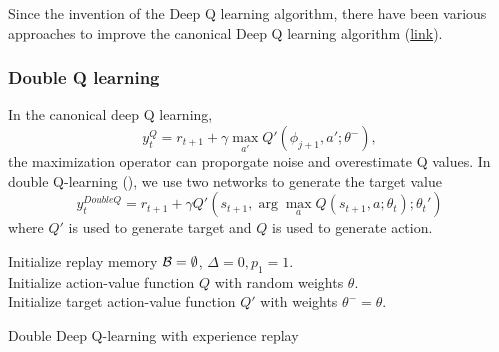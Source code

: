 \begin{refsection}
Since the invention of the Deep Q learning algorithm, there have been various approaches to improve the canonical Deep Q learning algorithm (\href{https://zhuanlan.zhihu.com/p/21547911}{link}).


\subsubsection{Double Q learning}

In the canonical deep Q learning, 
$$y_t^{Q} = r_{t+1} + \gamma \max_{a'}Q'(\phi_{j+1},a';\theta^-),$$
the maximization operator can proporgate noise and overestimate Q values. 
In double Q-learning (\cite{van2016deep}), we use two networks to generate the target value
$$y_t^{DoubleQ} = r_{t+1} + \gamma Q'(s_{t+1}, \arg\max_{a}Q(s_{t+1},a;\theta_t);\theta_t')$$
where $Q'$ is used to generate target and $Q$ is used to generate action. 


\begin{algorithm}
	Initialize replay memory $\mathcal{B} = \emptyset$, $\Delta = 0, p_1 = 1$.\\
	Initialize action-value function $Q$ with random weights $\theta$.\\
	Initialize target action-value function $Q'$ with weights $\theta^- = \theta$. \\
	\caption{Double Deep Q-learning with experience replay}
\end{algorithm}



\end{refsection}
